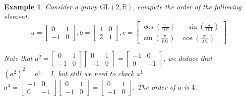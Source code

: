 \documentclass{article}
\theoremstyle{MyNonumberplain}
\theoremstyle{break}
\theoremstyle{break}
\newtheorem{example}{Example}[section]
\theoremstyle{break}
\theoremstyle{definition}
\theoremstyle{break}
\begin{document}
\begin{expbox}
    \begin{example}
        Consider a group $\text{GL} (2, \mathbb{R})$, compute the order of the
        following element.
        \[ a = \left[\begin{array}{cc}
            0 & 1\\
            - 1 & 0
        \end{array}\right], b = \left[\begin{array}{cc}
            1 & 0\\
            2 & 1
        \end{array}\right], c = \left[\begin{array}{cc}
            \cos \left( \frac{\pi}{101} \right) & - \sin \left( \frac{\pi}{101}
            \right)\\
            \sin \left( \frac{\pi}{101} \right) & \cos \left( \frac{\pi}{101} \right)
        \end{array}\right] \]

        \begin{ansbox}
            Note that $a^2 = \left[\begin{array}{cc}
                0 & 1\\
                - 1 & 0
                \end{array}\right] \left[\begin{array}{cc}
                0 & 1\\
                - 1 & 0
                \end{array}\right] = \left[\begin{array}{cc}
                - 1 & 0\\
                0 & - 1
                \end{array}\right]$, we deduce that $(a^2)^2 = a^4 = I$, but still we
                need to check $a^3$. $a^3 = \left[\begin{array}{cc}
                - 1 & 0\\
                0 & - 1
                \end{array}\right] \left[\begin{array}{cc}
                0 & 1\\
                - 1 & 0
                \end{array}\right] = \left[\begin{array}{cc}
                0 & 1\\
                - 1 & 0
                \end{array}\right]$. The order of $a$ is $4$.\bigskip
        

\end{ansbox}
\end{example}
\end{expbox}
\end{document}
